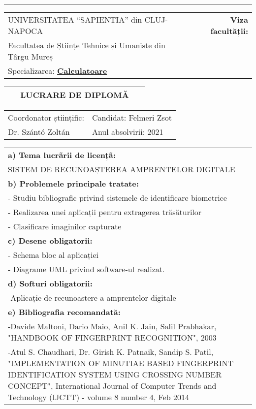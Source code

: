 \documentclass[a4paper, 11pt]{article}
\begin{document}
\begin{titlepage}
\noindent \rule{\textwidth}{1pt}
\vspace{1em}

\noindent \begin{tabular}{|l c r|}
\hline
UNIVERSITATEA “SAPIENTIA” din CLUJ-NAPOCA & & \textbf{Viza facultății:}\\
Facultatea de Științe Tehnice și Umaniste din Târgu Mureș & & \\
Specializarea: \textbf{\underline{Calculatoare}} & & \\
\hline
\end{tabular}
\begin{tabular}{|p{} c p{}|}
\ & \textbf{LUCRARE DE DIPLOMĂ} &\ \\[3pt]
\hline
\end{tabular}
\begin{tabular}{|p{} | p{}|}
Coordonator științific: & Candidat: Felmeri Zsot\\
Dr. Szántó Zoltán & Anul absolvirii: 2021\\
\hline
\end{tabular}
\begin{tabular}{|p{}|}
\textbf{a) Tema lucrãrii de licențã:}\\[3pt]
SISTEM DE RECUNOAȘTEREA AMPRENTELOR DIGITALE\\[4ex]
\textbf{b) Problemele principale tratate:}\\[3pt]
- Studiu bibliografic privind sistemele de identificare biometrice\\
- Realizarea unei aplicații pentru extragerea trăsăturilor\\
- Clasificare imaginilor capturate\\[4ex]
\textbf{c) Desene obligatorii:}\\[3pt]
- Schema bloc al aplicației\\
- Diagrame UML privind software-ul realizat.\\[4ex]
\textbf{d) Softuri obligatorii:}\\[3pt]
-Aplicație de recunoastere a amprentelor digitale\\[4ex]
\textbf{e) Bibliografia recomandată:}\\[3pt]
[1] -Davide Maltoni, Dario Maio, Anil K. Jain, Salil Prabhakar, "HANDBOOK OF FINGERPRINT RECOGNITION", 2003\\[2pt]
[2] -Atul S. Chaudhari, Dr. Girish K. Patnaik, Sandip S. Patil, "IMPLEMENTATION OF MINUTIAE BASED FINGERPRINT IDENTIFICATION SYSTEM USING CROSSING NUMBER CONCEPT", International Journal of Computer Trends and Technology (IJCTT) - volume 8 number 4,  Feb 2014\\[4ex]

\end{tabular}
\end{titlepage}
\end{document}
